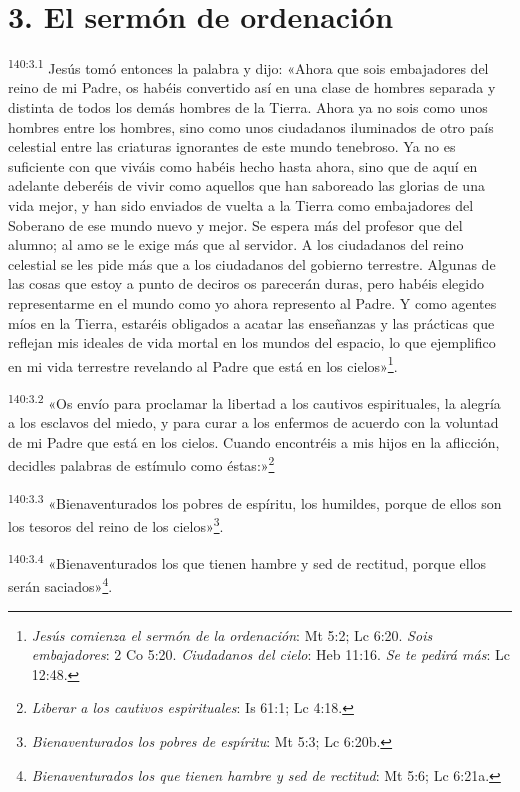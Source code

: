 \section*{3. El sermón de ordenación}
\par 
\textsuperscript{140:3.1} Jesús tomó entonces la palabra y dijo: «Ahora que sois embajadores del reino de mi Padre, os habéis convertido así en una clase de hombres separada y distinta de todos los demás hombres de la Tierra. Ahora ya no sois como unos hombres entre los hombres, sino como unos ciudadanos iluminados de otro país celestial entre las criaturas ignorantes de este mundo tenebroso. Ya no es suficiente con que viváis como habéis hecho hasta ahora, sino que de aquí en adelante deberéis de vivir como aquellos que han saboreado las glorias de una vida mejor, y han sido enviados de vuelta a la Tierra como embajadores del Soberano de ese mundo nuevo y mejor. Se espera más del profesor que del alumno; al amo se le exige más que al servidor. A los ciudadanos del reino celestial se les pide más que a los ciudadanos del gobierno terrestre. Algunas de las cosas que estoy a punto de deciros os parecerán duras, pero habéis elegido representarme en el mundo como yo ahora represento al Padre. Y como agentes míos en la Tierra, estaréis obligados a acatar las enseñanzas y las prácticas que reflejan mis ideales de vida mortal en los mundos del espacio, lo que ejemplifico en mi vida terrestre revelando al Padre que está en los cielos»\footnote{\textit{Jesús comienza el sermón de la ordenación}: Mt 5:2; Lc 6:20. \textit{Sois embajadores}: 2 Co 5:20. \textit{Ciudadanos del cielo}: Heb 11:16. \textit{Se te pedirá más}: Lc 12:48.}.

\par 
\textsuperscript{140:3.2} «Os envío para proclamar la libertad a los cautivos espirituales, la alegría a los esclavos del miedo, y para curar a los enfermos de acuerdo con la voluntad de mi Padre que está en los cielos. Cuando encontréis a mis hijos en la aflicción, decidles palabras de estímulo como éstas:»\footnote{\textit{Liberar a los cautivos espirituales}: Is 61:1; Lc 4:18.}

\par 
\textsuperscript{140:3.3} «Bienaventurados los pobres de espíritu, los humildes, porque de ellos son los tesoros del reino de los cielos»\footnote{\textit{Bienaventurados los pobres de espíritu}: Mt 5:3; Lc 6:20b.}.

\par 
\textsuperscript{140:3.4} «Bienaventurados los que tienen hambre y sed de rectitud, porque ellos serán saciados»\footnote{\textit{Bienaventurados los que tienen hambre y sed de rectitud}: Mt 5:6; Lc 6:21a.}.


